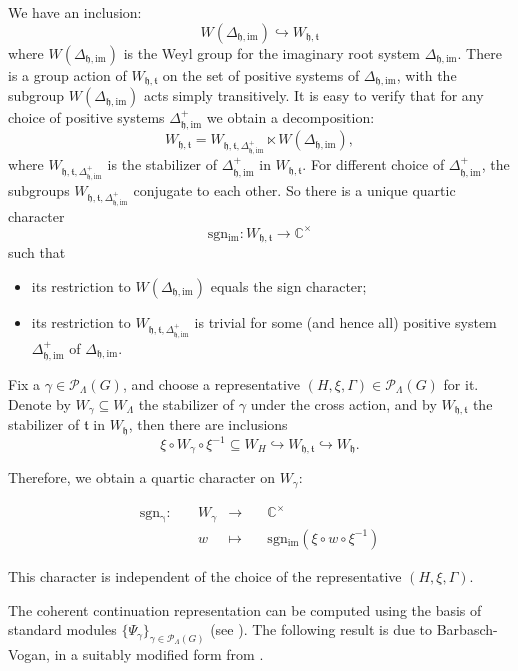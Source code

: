 \documentclass[12pt, a4paper]{amsart}
\numberwithin{equation}{section}
\newcommand{\BC}{{\mathbb {C}}}
\newcommand{\CP}{{\mathcal {P}}}
\newcommand{\fh}{\mathfrak{h}}
\newcommand{\ft}{\mathfrak{t}}
\newcommand{\defmap}[5]{
           \begin{equation*}
              \begin{aligned}
                   #1:\quad  & #2 &\longrightarrow &\quad #3 \\
                      \quad  & #4    &\longmapsto  &\quad #5
              \end{aligned}
           \end{equation*}
          }
\begin{document}
We have an inclusion:
\begin{equation}
    W(\Delta_{\fh,\mathrm{im}}) \hookrightarrow  W_{\fh,\ft}
\end{equation}
where $W(\Delta_{\mathrm{\fh,im}})$ is the Weyl group for the imaginary root system $\Delta_{\fh,\mathrm{im}}$. There is a group action of $W_{\fh,\ft}$ on the set of positive systems of $\Delta_{\fh,\mathrm{im}}$, with the subgroup $W(\Delta_{\fh,\mathrm{im}})$ acts simply transitively. It is easy to verify that for any choice of positive systems $\Delta_{\fh,\mathrm{im}}^{+}$ we obtain a decomposition:
\begin{equation}
    W_{\fh,\ft} = W_{\fh,\ft,\Delta_{\fh,\mathrm{im}}^{+}} \ltimes W(\Delta_{\fh,\mathrm{im}}),
\end{equation}
where $W_{\fh,\ft,\Delta_{\fh,\mathrm{im}}^{+}}$ is the stabilizer of $\Delta_{\fh,\mathrm{im}}^{+}$ in $W_{\fh,\ft}$. For different choice of $\Delta_{\fh,\mathrm{im}}^{+}$, the subgroups $W_{\fh,\ft,\Delta_{\fh,\mathrm{im}}^{+}}$ conjugate to each other. So there is a unique quartic character
$$\mathrm{sgn_{im}}: W_{\fh,\ft} \to \BC^{\times}$$
such that
\begin{itemize}
    \item its restriction to $W(\Delta_{\fh,\mathrm{im}})$ equals the sign character;
    \item its restriction to $W_{\fh,\ft,\Delta_{\fh,\mathrm{im}}^{+}}$ is trivial for some (and hence all) positive system $\Delta_{\fh,\mathrm{im}}^{+}$ of $\Delta_{\fh,\mathrm{im}}$.
\end{itemize}

Fix a $\gamma \in \CP_{\Lambda}(G)$, and choose a representative $(H,\xi,\Gamma) \in \mathscr{P}_{\Lambda}(G)$ for it. Denote by $W_{\gamma} \subseteq W_{\Lambda}$ the stabilizer of $\gamma$ under the cross action, and by $W_{\fh,\ft}$ the stabilizer of $\ft$ in $W_{\fh}$, then there are inclusions
$$\xi \circ W_{\gamma} \circ \xi^{-1} \subseteq W_{H} \hookrightarrow W_{\fh,\ft} \hookrightarrow W_{\fh}.$$

Therefore, we obtain a quartic character on $W_{\gamma}$:
\defmap{\mathrm{sgn_{\gamma}}}{W_{\gamma}}{\BC^{\times}}{w}{\mathrm{sgn_{im}}(\xi \circ w \circ \xi^{-1})}
This character is independent of the choice of the representative $(H,\xi,\Gamma)$.

The coherent continuation representation can be computed using the basis of standard modules $\{ \Psi_{\gamma} \}_{\gamma \in \CP_{\Lambda}(G)}$ (see \cite[Section14]{Vog82}). The following result is due to Barbasch-Vogan, in a suitably modified form from \cite[Proposition 2.4]{BV82}.
\end{document}
